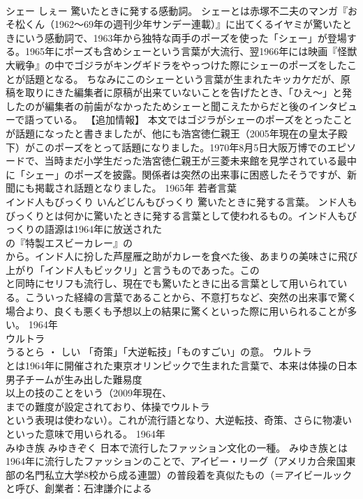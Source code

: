 \documentclass[8pt]{extreport}
\begin{document}
\begin{CJK}{UTF8}{min}
\\	シェー	しぇー	驚いたときに発する感動詞。	シェーとは赤塚不二夫のマンガ『おそ松くん（1962～69年の週刊少年サンデー連載）』に出てくるイヤミが驚いたときにいう感動詞で、1963年から独特な両手のポーズを使った「シェー」が登場する。1965年にポーズも含めシェーという言葉が大流行、翌1966年には映画『怪獣大戦争』の中でゴジラがキングギドラをやっつけた際にシェーのポーズをしたことが話題となる。 ちなみにこのシェーという言葉が生まれたキッカケだが、原稿を取りにきた編集者に原稿が出来ていないことを告げたとき、「ひえ～」と発したのが編集者の前歯がなかったためシェーと聞こえたからだと後のインタビューで語っている。 【追加情報】 本文ではゴジラがシェーのポーズをとったことが話題になったと書きましたが、他にも浩宮徳仁親王（2005年現在の皇太子殿下）がこのポーズをとって話題になりました。1970年8月5日大阪万博でのエピソードで、当時まだ小学生だった浩宮徳仁親王が三菱未来館を見学されている最中に「シェー」のポーズを披露。関係者は突然の出来事に困惑したそうですが、新聞にも掲載され話題となりました。	1965年	若者言葉	
\\	インド人もびっくり	いんどじんもびっくり	驚いたときに発する言葉。	ンド人もびっくりとは何かに驚いたときに発する言葉として使われるもの。インド人もびっくりの語源は1964年に放送された
\\	の『特製エスビーカレー』の
\\	から。インド人に扮した芦屋雁之助がカレーを食べた後、あまりの美味さに飛び上がり「インド人もビックリ」と言うものであった。この
\\	と同時にセリフも流行し、現在でも驚いたときに出る言葉として用いられている。こういった経緯の言葉であることから、不意打ちなど、突然の出来事で驚く場合より、良くも悪くも予想以上の結果に驚くといった際に用いられることが多い。	1964年	
\\	ウルトラ
\\	うるとら ・ しい	「奇策」「大逆転技」「ものすごい」の意。	ウルトラ
\\	とは1964年に開催された東京オリンピックで生まれた言葉で、本来は体操の日本男子チームが生み出した難易度
\\	以上の技のことをいう（2009年現在、
\\	までの難度が設定されており、体操でウルトラ
\\	という表現は使わない）。これが流行語となり、大逆転技、奇策、さらに物凄いといった意味で用いられる。	1964年	
\\	みゆき族	みゆきぞく	日本で流行したファッション文化の一種。	みゆき族とは1964年に流行したファッションのことで、アイビー・リーグ（アメリカ合衆国東部の名門私立大学8校から成る連盟）の普段着を真似たもの（＝アイビールックと呼び、創業者：石津謙介による

\end{CJK}
\end{document}
